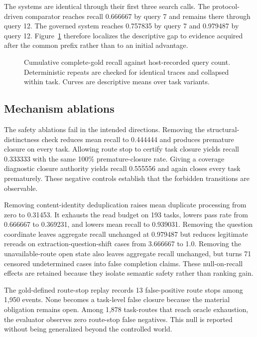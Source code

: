 The systems are identical through their first three search calls. The
protocol-driven comparator reaches recall 0.666667 by query 7 and remains there
through query 12. The governed system reaches 0.757835 by query 7 and 0.979487
by query 12. Figure~\ref{fig:p2-2} therefore localizes the descriptive gap to
evidence acquired after the common prefix rather than to an initial advantage.

\begin{figure}[t]
\centering

\caption{Cumulative complete-gold recall against host-recorded query count.
Deterministic repeats are checked for identical traces and collapsed within
task. Curves are descriptive means over \OfflineTaskCount{} task variants.}
\label{fig:p2-2}
\end{figure}

\subsection{Mechanism ablations}
The safety ablations fail in the intended directions. Removing the
structural-distinctness check reduces mean recall to 0.444444 and produces
premature closure on every task. Allowing route stop to certify task closure
yields recall 0.333333 with the same 100\% premature-closure rate. Giving a
coverage diagnostic closure authority yields recall 0.555556 and again closes
every task prematurely. These negative controls establish that the forbidden
transitions are observable.

Removing content-identity deduplication raises mean duplicate processing from
zero to 0.31453. It exhausts the read budget on 193 tasks, lowers pass rate from
0.666667 to 0.369231, and lowers mean recall to 0.939031. Removing the question
coordinate leaves aggregate recall unchanged at 0.979487 but reduces legitimate
rereads on extraction-question-shift cases from 3.666667 to 1.0. Removing the
unavailable-route open state also leaves aggregate recall unchanged, but turns
71 censored undetermined cases into false completion claims. These null-on-recall
effects are retained because they isolate semantic safety rather than ranking
gain.

The gold-defined route-stop replay records 13 false-positive route stops among
1,950 events. None becomes a task-level false closure because the material
obligation remains open. Among 1,878 task-routes that reach oracle exhaustion,
the evaluator observes zero route-stop false negatives. This null is reported
without being generalized beyond the controlled world.

